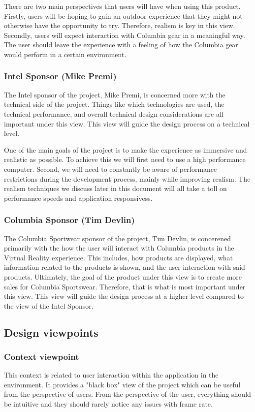 \documentclass[10pt,journal,compsoc,onecolumn, draftclsnofoot]{IEEEtran}
\begin{document}
There are two main perspectives that users will have when using this product.
Firstly, users will be hoping to gain an outdoor experience that they might not otherwise have the opportunity to try. Therefore, realism is key in this view.
Secondly, users will expect interaction with Columbia gear in a meaningful way.
The user should leave the experience with a feeling of how the Columbia gear would perform in a certain environment.

\subsubsection{Intel Sponsor (Mike Premi)}
The Intel sponsor of the project, Mike Premi, is concerned more with the technical side of the project.
Things like which technologies are used, the technical performance, and overall technical design considerations are all important under this view.
This view will guide the design process on a technical level.

One of the main goals of the project is to make the experience as immersive and realistic as possible. To achieve this we will first need to use a high performance computer. Second, we will need to constantly be aware of performance restrictions during the development process, mainly while improving realism. The realism techniques we discuss later in this document will all take a toll on performance speeds and application responsivess.

\subsubsection{Columbia Sponsor (Tim Devlin)}
The Columbia Sportwear sponsor of the project, Tim Devlin, is concerened primarily with the how the user will interact with Columbia products in the Virtual Reality experience.
This includes, how products are displayed, what information related to the products is shown, and the user interaction with said products.
Ultimately, the goal of the product under this view is to create more sales for Columbia Sportswear.
Therefore, that is what is most important under this view.
This view will guide the design process at a higher level compared to the view of the Intel Sponsor.

\subsection{Design viewpoints}
\subsubsection{Context viewpoint}
This context is related to user interaction within the application in the
environment. It provides a "black box" view of the project which can be useful
from the perspective of users. From the perspective of the user,
everything should be intuitive and they should rarely notice any issues with
frame rate.\\
\end{document}
